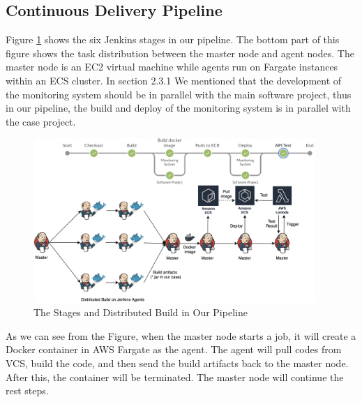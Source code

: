 \subsection{Continuous Delivery Pipeline}
\label{our-ci}
Figure \ref{fig:overview} shows the six Jenkins stages in our pipeline. The bottom part of this figure shows the task distribution between the master node and agent nodes. The master node is an EC2 virtual machine while agents run on Fargate instances within an ECS cluster. In section 2.3.1 We mentioned that the development of the monitoring system should be in parallel with the main software project, thus in our pipeline, the build and deploy of the monitoring system is in parallel with the case project.
\begin{figure}[!h]
     \centering
     \includegraphics[width=0.95\textwidth]{pics/overview.png}
     \caption{The Stages and Distributed Build in Our Pipeline}
     \label{fig:overview}
    \end{figure}
\par
As we can see from the Figure, when the master node starts a job, it will create a Docker container in AWS Fargate as the agent. The agent will pull codes from VCS, build the code, and then send the build artifacts back to the master node. After this, the container will be terminated. The master node will continue the rest steps.

